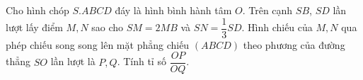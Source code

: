 \begin{ex}
Cho hình chóp $S.ABCD$ đáy là hình bình hành tâm $O$. Trên cạnh $SB$, $SD$ lần lượt lấy điểm $M,N$ sao cho $SM=2MB$ và $SN=\dfrac13SD$. Hình chiếu của $M,N$ qua phép chiếu song song lên mặt phẳng chiếu $(ABCD)$ theo phương của đường thẳng $SO$ lần lượt là $P,Q$. Tính tỉ số $\dfrac{OP}{OQ}$.
\end{ex}
